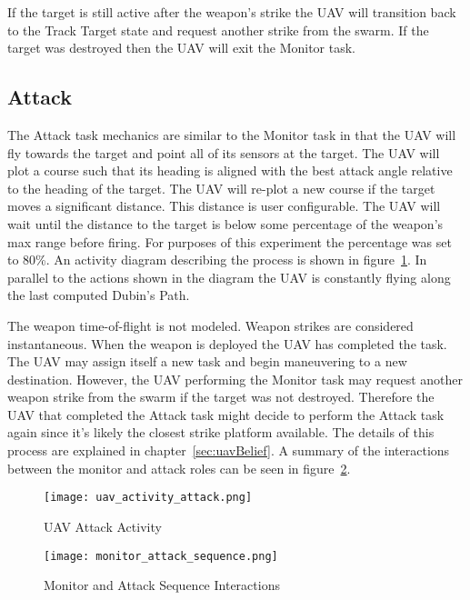 \begin{multicols*}{2}
If the target is still active after the weapon's strike the UAV will transition back to the Track Target state and request another strike from the swarm.  If the target was destroyed then the UAV will exit the Monitor task.


\subsection{Attack}
The Attack task mechanics are similar to the Monitor task in that the UAV will fly towards the target and point all of its sensors at the target.  The UAV will plot a course such that its heading is aligned with the best attack angle relative to the heading of the target.  The UAV will re-plot a new course if the target moves a significant distance.  This distance is user configurable.  The UAV will wait until the distance to the target is below some percentage of the weapon's max range before firing.  For purposes of this experiment the percentage was set to 80\%.  An activity diagram describing the process is shown in figure~\ref{fig:uavAttackActivity}.  In parallel to the actions shown in the diagram the UAV is constantly flying along the last computed Dubin's Path.

The weapon time-of-flight is not modeled.  Weapon strikes are considered instantaneous.  When the weapon is deployed the UAV has completed the task.  The UAV may assign itself a new task and begin maneuvering to a new destination.  However, the UAV performing the Monitor task may request another weapon strike from the swarm if the target was not destroyed.  Therefore the UAV that completed the Attack task might decide to perform the Attack task again since it's likely the closest strike platform available.  The details of this process are explained in chapter~\ref{sec:uavBelief}.  A summary of the interactions between the monitor and attack roles can be seen in figure~\ref{fig:monitorAttacKSequence}.

\end{multicols*}

\begin{figure}[H]
	\centering
	\texttt{[image: uav\_activity\_attack.png]}
	\caption{UAV Attack Activity}
	\label{fig:uavAttackActivity}
\end{figure}

\begin{figure}[H]
	\centering
	\texttt{[image: monitor\_attack\_sequence.png]}
	\caption{Monitor and Attack Sequence Interactions}
	\label{fig:monitorAttacKSequence}
\end{figure}

